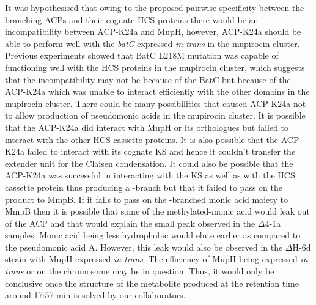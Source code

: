 It was hypothesised that owing to the proposed pairwise specificity between the branching ACPs and their cognate HCS proteins there would be an incompatibility between ACP-K24a and MupH, however, ACP-K24a should be able to perform well with the \textit{batC} expressed \textit{in trans} in the mupirocin cluster. Previous experiments showed that BatC L218M mutation was capable of functioning well with the HCS proteins in the mupirocin cluster, which suggests that the incompatibility may not be because of the BatC but because of the ACP-K24a which was unable to interact efficiently with the other domains in the mupirocin cluster. There could be many possibilities that caused ACP-K24a not to allow production of pseudomonic acids in the mupirocin cluster. It is possible that the ACP-K24a did interact with MupH or its orthologues but failed to interact with the other HCS cassette proteins. It is also possible that the ACP-K24a failed to interact with its cognate KS and hence it couldn't transfer the extender unit for the Claisen condensation. It could also be possible that the ACP-K24a was successful in interacting with the KS as well as with the HCS cassette protein thus producing a \bet-branch but that it failed to pass on the product to MmpB. If it fails to pass on the \bet-branched monic acid moiety to MmpB then it is possible that some of the methylated-monic acid would leak out of the ACP and that would explain the small peak observed in the $ \Delta $4-1a samples. Monic acid being less hydrophobic would elute earlier as compared to the pseudomonic acid A. However, this leak would also be observed in the $ \Delta $H-6d strain with MupH expressed \textit{in trans}. The efficiency of MupH being expressed \textit{in trans} or on the chromosome may be in question. Thus, it would only be conclusive once the structure of the metabolite produced at the retention time around 17:57 min is solved by our collaborators. 

